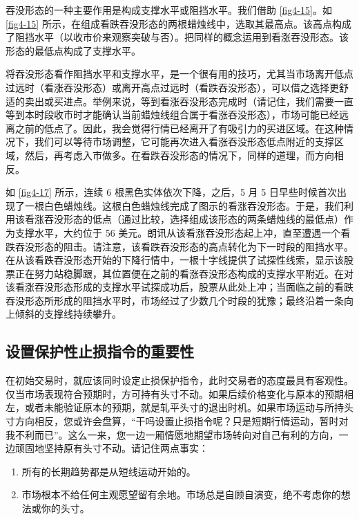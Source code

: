 吞没形态的一种主要作用是构成支撑水平或阻挡水平。我们借助 \autoref{fig4-15}。如 \autoref{fig4-15} 所示，在组成看跌吞没形态的两根蜡烛线中，选取其最高点。该高点构成了阻挡水平（以收市价来观察突破与否）。把同样的概念运用到看涨吞没形态。该形态的最低点构成了支撑水平。

将吞没形态看作阻挡水平和支撑水平，是一个很有用的技巧，尤其当市场离开低点过远时（看涨吞没形态）或离开高点过远时（看跌吞没形态），可以借之选择更舒适的卖出或买进点。举例来说，等到看涨吞没形态完成时（请记住，我们需要一直等到本时段收市时才能确认当前蜡烛线组合属于看涨吞没形态），市场可能已经远离之前的低点了。因此，我会觉得行情已经离开了有吸引力的买进区域。在这种情况下，我们可以等待市场调整，它可能再次进入看涨吞没形态低点附近的支撑区域，然后，再考虑入市做多。在看跌吞没形态的情况下，同样的道理，而方向相反。

如 \autoref{fig4-17} 所示，连续 6 根黑色实体依次下降，之后，5 月 5 日早些时候首次出现了一根白色蜡烛线。这根白色蜡烛线完成了图示的看涨吞没形态。于是，我们利用该看涨吞没形态的低点（通过比较，选择组成该形态的两条蜡烛线的最低点）作为支撑水平，大约位于 56 美元。朗讯从该看涨吞没形态起上冲，直至遭遇一个看跌吞没形态的阻击。请注意，该看跌吞没形态的高点转化为下一时段的阻挡水平。在从该看跌吞没形态开始的下降行情中，一根十字线提供了试探性线索，显示该股票正在努力站稳脚跟，其位置便在之前的看涨吞没形态构成的支撑水平附近。在对该看涨吞没形态形成的支撑水平试探成功后，股票从此处上冲；当面临之前的看跌吞没形态所形成的阻挡水平时，市场经过了少数几个时段的犹豫；最终沿着一条向上倾斜的支撑线持续攀升。

\subsection{设置保护性止损指令的重要性}
在初始交易时，就应该同时设定止损保护指令，此时交易者的态度最具有客观性。仅当市场表现符合预期时，方可持有头寸不动。如果后续价格变化与原本的预期相左，或者未能验证原本的预期，就是轧平头寸的退出时机。如果市场运动与所持头寸方向相反，您或许会盘算，“干吗设置止损指令呢？只是短期行情运动，暂时对我不利而已”。这么一来，您一边一厢情愿地期望市场转向对自己有利的方向，一边顽固地坚持原有头寸不动。请记住两点事实：
\begin{enumerate}
    \item 所有的长期趋势都是从短线运动开始的。
    \item 市场根本不给任何主观愿望留有余地。市场总是自顾自演变，绝不考虑你的想法或你的头寸。
\end{enumerate}
